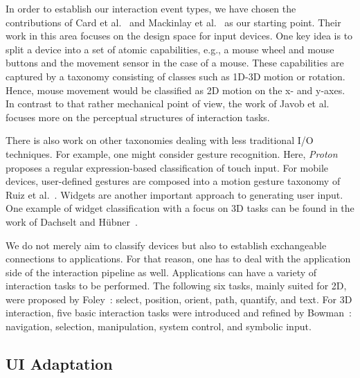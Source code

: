 \documentclass[twoside,twocolumn,10pt]{article}
\begin{document}
%
%
In order to establish our interaction event types, we have chosen the contributions of Card et al.~\cite{Card:1990:DSI:97243.97263} and Mackinlay et al.~\cite{Mackinlay:1990:SAD:1456610.1456612} as our starting point. Their work in this area focuses on the design space for input devices. One key idea is to split a device into a set of atomic capabilities, e.g., a mouse wheel and mouse buttons and the movement sensor in the case of a mouse. These capabilities are captured by a taxonomy consisting of classes such as 1D-3D motion or rotation. Hence, mouse movement would be classified as 2D motion on the x- and y-axes. In contrast to that rather mechanical point of view, the work of Javob et al.~\cite{Jacob:1994:ISI:174630.174631} focuses more on the perceptual structures of interaction tasks.




There is also work on other taxonomies dealing with less traditional I/O techniques. For example, one might consider gesture recognition. Here, \textit{Proton}~\cite{Kin:2012:PMG:2207676.2208694} proposes a regular expression-based classification of touch input. For mobile devices, user-defined gestures are composed into a motion gesture taxonomy of Ruiz et al.~\cite{Ruiz:2011:UMG:1978942.1978971}. Widgets are another important approach to generating user input. One example of widget classification with a focus on 3D tasks can be found in the work of Dachselt and H\"{u}bner~\cite{Dachselt:2006:STM:2386021.2386035}.


%
%
We do not merely aim to classify devices but also to establish exchangeable connections to applications. For that reason, one has to deal with the application side of the interaction pipeline as well. Applications can have a variety of interaction tasks to be performed. The following six tasks, mainly suited for 2D, were proposed by Foley~\cite{FoleyWallaceEtAl1984}: select, position, orient, path, quantify, and text. For 3D interaction, five basic interaction tasks were introduced and refined by Bowman~\cite{Bowman99interactiontechniques, Bowman:2004:UIT:993837}: navigation, selection, manipulation, system control, and symbolic input.


%
%
\subsection{UI Adaptation}
\end{document}
